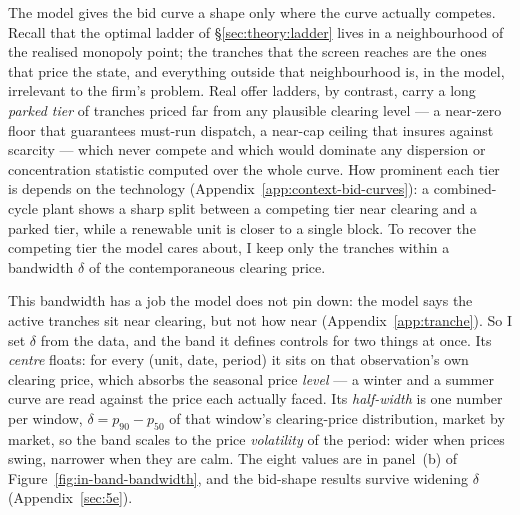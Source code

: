 \documentclass[11pt,a4paper]{article}
\theoremstyle{definition}
\theoremstyle{remark}
\theoremstyle{plain}
\begin{document}
The model gives the bid curve a shape only where the curve actually competes. Recall that the optimal ladder of \S\ref{sec:theory:ladder} lives in a neighbourhood of the realised monopoly point; the tranches that the screen reaches are the ones that price the state, and everything outside that neighbourhood is, in the model, irrelevant to the firm's problem. Real offer ladders, by contrast, carry a long \emph{parked tier} of tranches priced far from any plausible clearing level --- a near-zero floor that guarantees must-run dispatch, a near-cap ceiling that insures against scarcity --- which never compete and which would dominate any dispersion or concentration statistic computed over the whole curve. How prominent each tier is depends on the technology (Appendix~\ref{app:context-bid-curves}): a combined-cycle plant shows a sharp split between a competing tier near clearing and a parked tier, while a renewable unit is closer to a single block.
 To recover the competing tier the model cares about, I keep only the tranches within a bandwidth $\delta$ of the contemporaneous clearing price.

This bandwidth has a job the model does not pin down: the model says the active tranches sit near clearing, but not how near (Appendix~\ref{app:tranche}). So I set $\delta$ from the data, and the band it defines controls for two things at once. Its \emph{centre} floats: for every (unit, date, period) it sits on that observation's own clearing price, which absorbs the seasonal price \emph{level} --- a winter and a summer curve are read against the price each actually faced. Its \emph{half-width} is one number per window, $\delta = p_{90}-p_{50}$ of that window's clearing-price distribution, market by market, so the band scales to the price \emph{volatility} of the period: wider when prices swing, narrower when they are calm. The eight values are in panel~(b) of Figure~\ref{fig:in-band-bandwidth}, and the bid-shape results survive widening $\delta$ (Appendix~\ref{sec:5e}).
\end{document}
